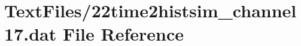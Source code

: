 \hypertarget{22time2histsim__channel17_8dat}{}\section{Text\+Files/22time2histsim\+\_\+channel17.dat File Reference}
\label{22time2histsim__channel17_8dat}
